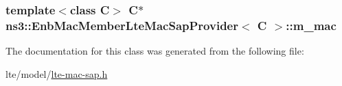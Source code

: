 \subsubsection[{\texorpdfstring{m\+\_\+mac}{m_mac}}]{\setlength{\rightskip}{0pt plus 5cm}template$<$class C$>$ {\bf C}$\ast$ {\bf ns3\+::\+Enb\+Mac\+Member\+Lte\+Mac\+Sap\+Provider}$<$ {\bf C} $>$\+::m\+\_\+mac\hspace{0.3cm}{\ttfamily [private]}}\hypertarget{classns3_1_1EnbMacMemberLteMacSapProvider_a52de17b722613f341b5f3e3175ccd52a}{}\label{classns3_1_1EnbMacMemberLteMacSapProvider_a52de17b722613f341b5f3e3175ccd52a}


The documentation for this class was generated from the following file\+:\begin{DoxyCompactItemize}
\item 
lte/model/\hyperlink{lte-mac-sap_8h}{lte-\/mac-\/sap.\+h}\end{DoxyCompactItemize}
